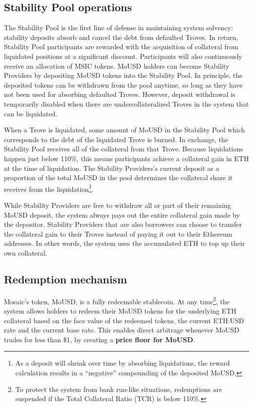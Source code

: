 \documentclass{article}
\begin{document}
\subsection{Stability Pool operations}
The Stability Pool is the first line of defense in maintaining system solvency: stability deposits absorb and cancel the debt from defaulted Troves. In return, Stability Pool participants are rewarded with the acquisition of collateral from liquidated positions at a significant discount. Participants will also continuously receive an allocation of MSIC tokens.
MoUSD holders can become Stability Providers by depositing MoUSD tokens into the Stability Pool. In principle, the deposited tokens can be withdrawn from the pool anytime, so long as they have not been used for absorbing defaulted Troves. However, deposit withdrawal is temporarily disabled when there are undercollateralized Troves in the system that can be liquidated.

When a Trove is liquidated, some amount of MoUSD in the Stability Pool which corresponds to the debt of the liquidated Trove is burned. In exchange, the Stability Pool receives all of the collateral from that Trove. Because liquidations happen just below 110\%, this means participants achieve a collateral gain in ETH at the time of liquidation. The Stability Providers’s current deposit as a proportion of the total MoUSD in the pool determines the collateral share it receives from the liquidation\footnote{As a deposit will shrink over time by absorbing liquidations, the reward calculation results in a “negative” compounding of the deposited MoUSD.}. 

While Stability Providers are free to withdraw all or part of their remaining MoUSD deposit, the system always pays out the entire collateral gain made by the depositor. Stability Providers that are also borrowers can choose to transfer the collateral gain to their Troves instead of paying it out to their Ethereum addresses. In other words, the system uses the accumulated ETH to top up their own collateral. 

\subsection{Redemption mechanism}
Mosaic’s token, MoUSD, is a fully redeemable stablecoin. At any time\footnote{To protect the system from bank run-like situations, redemptions are suspended if the Total Collateral Ratio (TCR) is below 110\%.}, the system allows holders to redeem their MoUSD tokens for the underlying ETH collateral based on the face value of the redeemed tokens, the current ETH:USD rate and the current base rate. This enables direct arbitrage whenever MoUSD trades for less than \$1, by creating a \textbf{price floor for MoUSD}.\\
\end{document}
